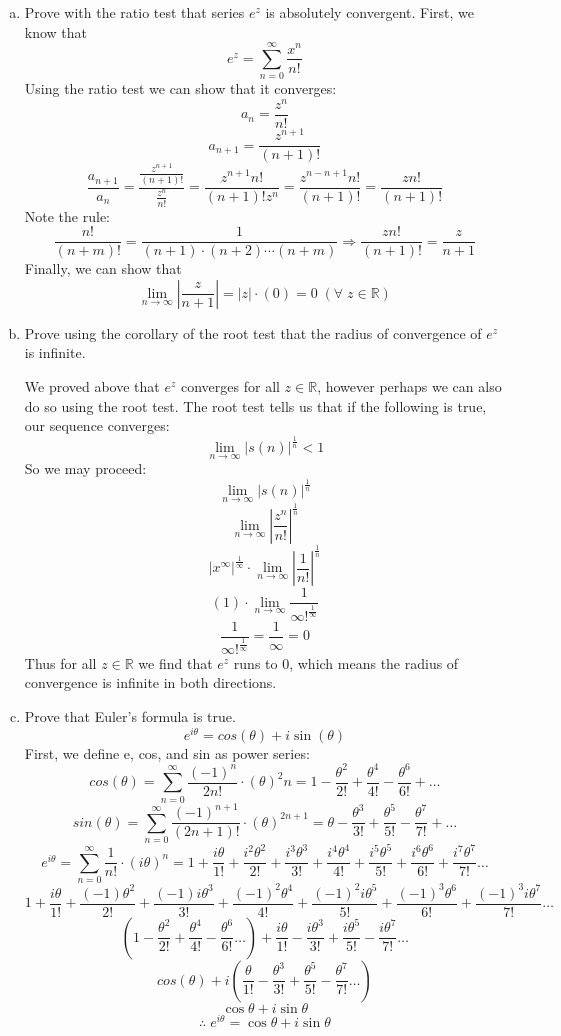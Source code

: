 \documentclass{article}
\begin{document}
\begin{enumerate}[a.]
    \item Prove with the ratio test that series $e^z$ is absolutely convergent.
          First, we know that
          \[e^z=\sum_{n=0}^{\infty}\frac{x^n}{n!}\]
          Using the ratio test we can show that it converges:
          \[a_n=\frac{z^n}{n!} \]
          \[a_{n+1}=\frac{z^{n+1}}{(n+1)!}\]
          \[\frac{a_{n+1}}{a_n}=\frac{\frac{z^{n+1}}{(n+1)!}}{\frac{z^n}{n!}} = \frac{z^{n+1}n!}{\left(n+1\right)!z^n}=\frac{z^{n-n+1}n!}{\left(n+1\right)!}=\frac{zn!}{\left(n+1\right)!}\]
          Note the rule:
          \[\frac{n!}{\left(n+m\right)!}=\frac{1}{\left(n+1\right)\cdot \left(n+2\right)\cdots \left(n+m\right)} \Rightarrow \frac{zn!}{\left(n+1\right)!}=\frac{z}{n+1}\]
          Finally, we can show that
          \[\lim_{n\to\infty}|\frac{z}{n+1}|=|z|\cdot(0)=0  \; (\forall \;  z \in \mathbb{R})\]
    \item Prove using the corollary of the root test that the radius of convergence of $e^z$ is infinite.

          We proved above that $e^z$ converges for all $z\in\mathbb{R}$, however perhaps we can also do so using the root test. The root test tells us that if the following is true, our sequence converges:
          \[\lim_{n\to\infty}|s(n)|^\frac{1}{n} < 1 \]
          So we may proceed:
          \[\lim_{n\to\infty}|s(n)|^\frac{1}{n}\]
          \[\lim_{n\to\infty}|\frac{z^n}{n!}|^\frac{1}{n}\]
          \[|x^\infty|^{\frac{1}{\infty}}\cdot\lim_{n\to\infty}|\frac{1}{n!}|^\frac{1}{n}\]
          \[(1)\cdot\lim_{n\to\infty}\frac{1}{\infty!^\frac{1}{\infty}}\]
          \[\frac{1}{\infty!^\frac{1}{\infty}}=\frac{1}{\infty}=0\]
          Thus for all $z\in\mathbb{R}$ we find that $e^z$ runs to 0, which means the radius of convergence is infinite in both directions.

    \item Prove that Euler's formula is true.
          \[e^{i\theta} = cos(\theta) + i\sin(\theta)\]
          First, we define e, cos, and sin as power series:
          \[cos(\theta) = \sum_{n=0}^{\infty} \frac{(-1)^n}{2n!} \cdot (\theta)^2n = 1-\frac{\theta^2}{2!}+\frac{\theta^4}{4!}-\frac{\theta^6}{6!}+\dots\]
          \[sin(\theta) = \sum_{n=0}^{\infty} \frac{(-1)^{n+1}}{(2n+1)!} \cdot (\theta)^{2n+1} = \theta-\frac{\theta^3}{3!}+\frac{\theta^5}{5!}-\frac{\theta^7}{7!}+\dots\]
          \[e^{i\theta} = \sum_{n=0}^{\infty} \frac{1}{n!} \cdot (i\theta)^n = 1+\frac{i\theta}{1!}+\frac{i^2\theta^2}{2!}+\frac{i^3\theta^3}{3!}+\frac{i^4\theta^4}{4!}+\frac{i^5\theta^5}{5!}+\frac{i^6\theta^6}{6!}+\frac{i^7\theta^7}{7!}\dots\]
          \[1+\frac{i\theta}{1!}+\frac{(-1)\theta^2}{2!}+\frac{(-1)i\theta^3}{3!}+\frac{(-1)^2\theta^4}{4!}+\frac{(-1)^2i\theta^5}{5!}+\frac{(-1)^3\theta^6}{6!}+\frac{(-1)^3i\theta^7}{7!}\dots\]
          \[(1-\frac{\theta^2}{2!}+\frac{\theta^4}{4!}-\frac{\theta^6}{6!}\dots)+\frac{i\theta}{1!}-\frac{i\theta^3}{3!}+\frac{i\theta^5}{5!}-\frac{i\theta^7}{7!}\dots\]
          \[cos(\theta)+i(\frac{\theta}{1!}-\frac{\theta^3}{3!}+\frac{\theta^5}{5!}-\frac{\theta^7}{7!}\dots)\]
          \[\cos{\theta}+i\sin{\theta} \]
          \[\therefore \; e^{i\theta}=\cos{\theta}+i\sin{\theta} \]

\end{enumerate}
\end{document}
